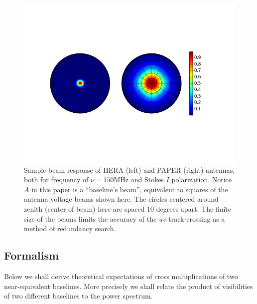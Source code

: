 \documentclass[twocolumn,apj,numberedappendix]{emulateapj}
\renewcommand\[{\begin{equation}}
\renewcommand\]{\end{equation}}
\begin{document}
\begin{figure}[H]
\includegraphics[width=1.2\linewidth]{Beams}

\caption{Sample beam response of HERA (left) and PAPER (right) antennas, both
for frequency of $\nu=150\text{MHz}$ and Stokes $I$ polarization. Notice $A$ in this paper is a ``baseline's beam'', equivalent to squares of the antenna voltage beams shown here. The circles centered around zenith (center of beam) here are
spaced 10 degrees apart. The finite size of the beams limits the accuracy of the $uv$ track-crossing as a method of redundancy search. \label{fig:Beam}}
\end{figure}



\subsection{Formalism}
Below we shall derive theoretical expectations of cross multiplications
of two near-equivalent baselines. More precisely we shall relate
the product of visibilities of two different baselines to the power spectrum. 
\end{document}
